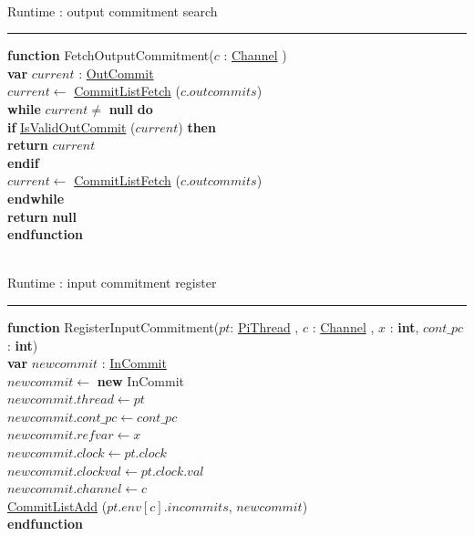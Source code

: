 \documentclass[a4paper,11pt]{article}
\newenvironment{program}{
  \begin{sffamily}
  \begin{scriptsize}
  \begin{tabbing}}
 {\end{tabbing}
  \end{scriptsize}
  \end{sffamily}}
\newcommand{\kw}[1]{\textsf{\textbf{#1}}}
\newcommand{\pindent}{\hspace{2em}\=}
\newcommand{\algotitle}[1]{\noindent\\ \noindent#1\par\nobreak\vspace{3pt}\hrule\vspace{6pt}}
\newcommand{\algosection}[1]{
  \phantomsection
  \algotitle{#1}
}
\newcommand{\myref}[1]{
  \hyperref[#1]{#1}
}
\begin{document}
\label{FetchOutputCommitment}
\algosection{Runtime : output commitment search}
\begin{program}
  \kw{function} FetchOutputCommitment($c$ : \myref{Channel}) \\
  \pindent\kw{var} $current$ : \myref{OutCommit} \\
  \>$current \leftarrow$ \myref{CommitListFetch}($c.outcommits$) \\
  \>\kw{while} $current \neq$ \kw{null} \kw{do} \\
  \>\pindent\kw{if} \myref{IsValidOutCommit}($current$) \kw{then} \\
  \>\>\pindent\kw{return} $current$ \\
  \>\>\kw{endif} \\
  \>\>$current \leftarrow$ \myref{CommitListFetch}($c.outcommits$) \\
  \>\kw{endwhile} \\
  \>\kw{return} \kw{null} \\
  \kw{endfunction}
\end{program}


\label{RegisterInputCommitment}
\algosection{Runtime : input commitment register}
\begin{program}
  \kw{function} RegisterInputCommitment($pt$: \myref{PiThread}, $c$ : \myref{Channel}, $x$ : \kw{int}, $cont\_pc$ : \kw{int}) \\
  \pindent\kw{var} $newcommit$ : \myref{InCommit} \\
  \>$newcommit \leftarrow$ \kw{new} InCommit \\
  \>$newcommit.thread \leftarrow pt$ \\
  \>$newcommit.cont\_pc \leftarrow cont\_pc$ \\
  \>$newcommit.refvar \leftarrow x$\\
  \>$newcommit.clock \leftarrow pt.clock$ \\
  \>$newcommit.clockval \leftarrow pt.clock.val$ \\
  \>$newcommit.channel \leftarrow c$ \\
  \>\myref{CommitListAdd}($pt.env[c].incommits$, $newcommit$) \\
  \kw{endfunction}
\end{program}
\end{document}
